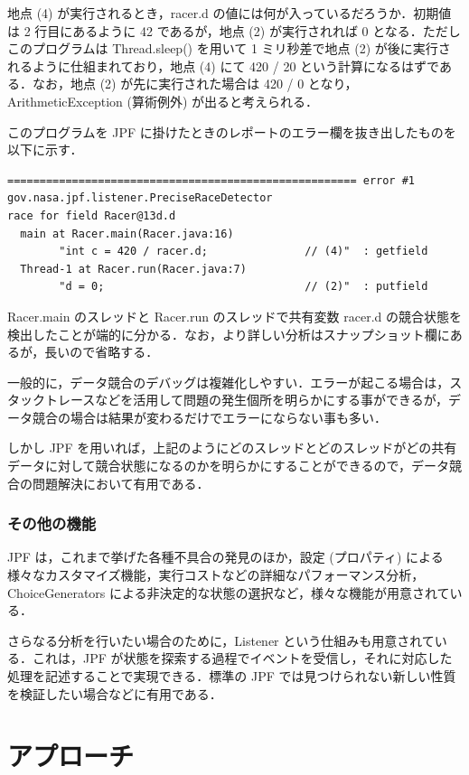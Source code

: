 \documentclass[a4j,12pt]{jarticle}
\begin{document}
地点 (4) が実行されるとき，racer.d の値には何が入っているだろうか．初期値は 2 行目にあるように 42 であるが，地点 (2) が実行されれば 0 となる．ただしこのプログラムは Thread.sleep() を用いて 1 ミリ秒差で地点 (2) が後に実行されるように仕組まれており，地点 (4) にて 420 / 20 という計算になるはずである．なお，地点 (2) が先に実行された場合は 420 / 0 となり， ArithmeticException (算術例外) が出ると考えられる．

このプログラムを JPF に掛けたときのレポートのエラー欄を抜き出したものを以下に示す．


\begin{verbatim}
====================================================== error #1
gov.nasa.jpf.listener.PreciseRaceDetector
race for field Racer@13d.d
  main at Racer.main(Racer.java:16)
		"int c = 420 / racer.d;               // (4)"  : getfield
  Thread-1 at Racer.run(Racer.java:7)
		"d = 0;                               // (2)"  : putfield
\end{verbatim}

Racer.main のスレッドと Racer.run のスレッドで共有変数 racer.d の競合状態を検出したことが端的に分かる．なお，より詳しい分析はスナップショット欄にあるが，長いので省略する．

一般的に，データ競合のデバッグは複雑化しやすい．エラーが起こる場合は，スタックトレースなどを活用して問題の発生個所を明らかにする事ができるが，データ競合の場合は結果が変わるだけでエラーにならない事も多い．

しかし JPF を用いれば，上記のようにどのスレッドとどのスレッドがどの共有データに対して競合状態になるのかを明らかにすることができるので，データ競合の問題解決において有用である．

\subsubsection{その他の機能}

JPF は，これまで挙げた各種不具合の発見のほか，設定 (プロパティ) による様々なカスタマイズ機能，実行コストなどの詳細なパフォーマンス分析，ChoiceGenerators による非決定的な状態の選択など，様々な機能が用意されている．

さらなる分析を行いたい場合のために，Listener という仕組みも用意されている．これは，JPF が状態を探索する過程でイベントを受信し，それに対応した処理を記述することで実現できる．標準の JPF では見つけられない新しい性質を検証したい場合などに有用である．

\section{アプローチ}
\end{document}
